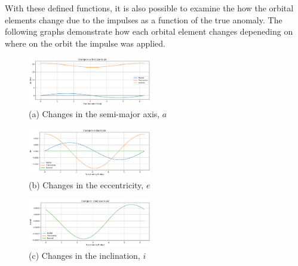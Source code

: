 \documentclass[12pt,twocolumn]{article}  %
\begin{document}
With these defined functions, it is also possible to examine the how the orbital elements change due to the impulses as a function of 
the true anomaly. The following graphs demonstrate how each orbital element changes depeneding on where on the orbit the impulse was applied. 
\begin{figure}[H]
    \centering
    \includegraphics[width=0.48\textwidth]{Images/del_a.png}
    \caption*{(a) Changes in the semi-major axis, $a$}
\end{figure}
\vspace{-2em}
\begin{figure}[H]
    \centering
    \includegraphics[width=0.48\textwidth]{Images/del_e.png}
    \caption*{(b) Changes in the eccentricity, $e$}
\end{figure}
\vspace{-2em}
\begin{figure}[H]
    \centering
    \includegraphics[width=0.48\textwidth]{Images/del_i.png}
    \caption*{(c) Changes in the inclination, $i$}
\end{figure}
\end{document}
